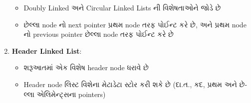 \documentclass[]{article}
\providecommand{\tightlist}{%
  \setlength{\itemsep}{0pt}\setlength{\parskip}{0pt}}
\begin{document}
\begin{enumerate}
  \begin{itemize}
  \tightlist
  \item
    Doubly Linked \textgujarati{અને} Circular Linked Lists
    \textgujarati{ની} \textgujarati{વિશેષતાઓને} \textgujarati{જોડે}
    \textgujarati{છે}
  \item
    \textgujarati{છેલ્લા} node \textgujarati{નો} next pointer
    \textgujarati{પ્રથમ} node \textgujarati{તરફ} \textgujarati{પોઈન્ટ}
    \textgujarati{કરે} \textgujarati{છે}, \textgujarati{અને}
    \textgujarati{પ્રથમ} node \textgujarati{નો} previous pointer
    \textgujarati{છેલ્લા} node \textgujarati{તરફ} \textgujarati{પોઈન્ટ}
    \textgujarati{કરે} \textgujarati{છે}
  \end{itemize}
\item
  \textbf{Header Linked List}:

  \begin{itemize}
  \tightlist
  \item
    \textgujarati{શરૂઆતમાં} \textgujarati{એક} \textgujarati{વિશેષ} header
    node \textgujarati{ધરાવે} \textgujarati{છે}
  \item
    Header node \textgujarati{લિસ્ટ} \textgujarati{વિશેના}
    \textgujarati{મેટાડેટા} \textgujarati{સ્ટોર} \textgujarati{કરી}
    \textgujarati{શકે} \textgujarati{છે}
    (\textgujarati{દા}.\textgujarati{ત}., \textgujarati{કદ},
    \textgujarati{પ્રથમ} \textgujarati{અને} \textgujarati{છેલ્લા}
    \textgujarati{એલિમેન્ટ્સના} pointers)
  \end{itemize}
\end{enumerate}
\end{document}
